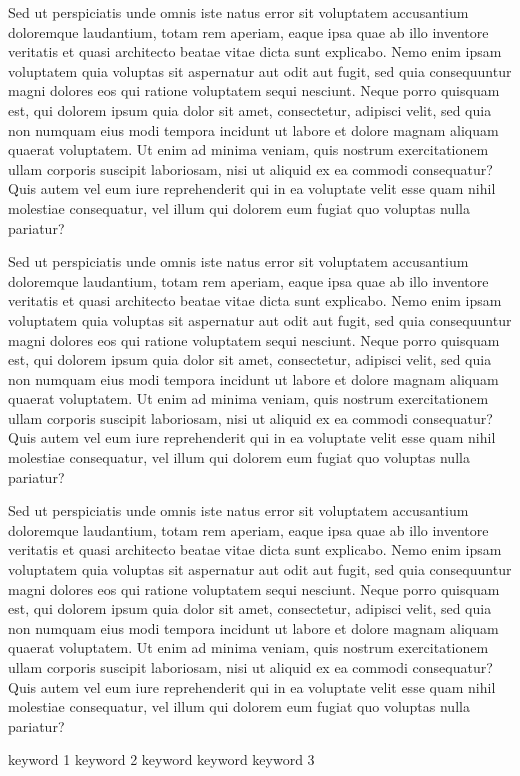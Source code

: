 \documentclass{article}
\begin{document}
	\begin{myabstract}[english]

Sed ut perspiciatis unde omnis iste natus error sit voluptatem accusantium doloremque laudantium, totam rem aperiam, eaque ipsa quae ab illo inventore veritatis et quasi architecto beatae vitae dicta sunt explicabo. Nemo enim ipsam voluptatem quia voluptas sit aspernatur aut odit aut fugit, sed quia consequuntur magni dolores eos qui ratione voluptatem sequi nesciunt. Neque porro quisquam est, qui dolorem ipsum quia dolor sit amet, consectetur, adipisci velit, sed quia non numquam eius modi tempora incidunt ut labore et dolore magnam aliquam quaerat voluptatem. Ut enim ad minima veniam, quis nostrum exercitationem ullam corporis suscipit laboriosam, nisi ut aliquid ex ea commodi consequatur? Quis autem vel eum iure reprehenderit qui in ea voluptate velit esse quam nihil molestiae consequatur, vel illum qui dolorem eum fugiat quo voluptas nulla pariatur?

Sed ut perspiciatis unde omnis iste natus error sit voluptatem accusantium doloremque laudantium, totam rem aperiam, eaque ipsa quae ab illo inventore veritatis et quasi architecto beatae vitae dicta sunt explicabo. Nemo enim ipsam voluptatem quia voluptas sit aspernatur aut odit aut fugit, sed quia consequuntur magni dolores eos qui ratione voluptatem sequi nesciunt. Neque porro quisquam est, qui dolorem ipsum quia dolor sit amet, consectetur, adipisci velit, sed quia non numquam eius modi tempora incidunt ut labore et dolore magnam aliquam quaerat voluptatem. Ut enim ad minima veniam, quis nostrum exercitationem ullam corporis suscipit laboriosam, nisi ut aliquid ex ea commodi consequatur? Quis autem vel eum iure reprehenderit qui in ea voluptate velit esse quam nihil molestiae consequatur, vel illum qui dolorem eum fugiat quo voluptas nulla pariatur?
	
		\begin{mylaysummary}
		Sed ut perspiciatis unde omnis iste natus error sit voluptatem accusantium doloremque laudantium, totam rem aperiam, eaque ipsa quae ab illo inventore veritatis et quasi architecto beatae vitae dicta sunt explicabo. Nemo enim ipsam voluptatem quia voluptas sit aspernatur aut odit aut fugit, sed quia consequuntur magni dolores eos qui ratione voluptatem sequi nesciunt. Neque porro quisquam est, qui dolorem ipsum quia dolor sit amet, consectetur, adipisci velit, sed quia non numquam eius modi tempora incidunt ut labore et dolore magnam aliquam quaerat voluptatem. Ut enim ad minima veniam, quis nostrum exercitationem ullam corporis suscipit laboriosam, nisi ut aliquid ex ea commodi consequatur? Quis autem vel eum iure reprehenderit qui in ea voluptate velit esse quam nihil molestiae consequatur, vel illum qui dolorem eum fugiat quo voluptas nulla pariatur?
		\end{mylaysummary}
		
		\begin{mykeywords}
			\mykeyword keyword 1
			\mykeyword keyword 2
			\mykeyword keyword keyword keyword 3
		\end{mykeywords}

	\end{myabstract}
\end{document}
